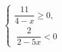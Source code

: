\begin{ex}[type=ineq_system]
	\begin{condition}
		$\begin{cases} \dfrac{11}{4 - x}\geqslant0 ,\\
			\; \dfrac{2}{2 - 5x}<0  
		\end{cases}$
	\end{condition}
\end{ex}